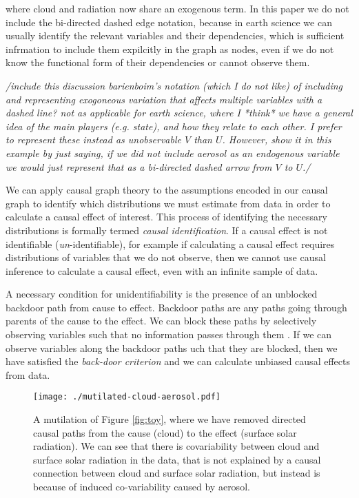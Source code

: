 \documentclass[12pt]{article}
\begin{document}
where cloud and radiation now share an exogenous term. In this paper
we do not include the bi-directed dashed edge notation, because in
earth science we can usually identify the relevant variables and their
dependencies, which is sufficient infrmation to include them
expilcitly in the graph as nodes, even if we do not know the
functional form of their dependencies or cannot observe them.

\textit{/include this discussion barienboim's notation (which I do not
  like) of including and representing exogoneous variation that
  affects multiple variables with a dashed line? not as applicable for
  earth science, where I *think* we have a general idea of the main
  players (e.g. state), and how they relate to each other. I prefer to
  represent these instead as unobservable $V$ than $U$. However, show
  it in this example by just saying, if we did not include aerosol as
  an endogenous variable we would just represent that as a bi-directed
  dashed arrow from $V$ to $U$./}

We can apply causal graph theory
\citep[e.g.,][]{pearl1995causal,shpitser2006} to the assumptions
encoded in our causal graph to identify which distributions we must
estimate from data in order to calculate a causal effect of
interest. This process of identifying the necessary distributions is
formally termed \emph{causal identification}. If a causal effect is
not identifiable (\emph{un}-identifiable), for example if calculating
a causal effect requires distributions of variables that we do not
observe, then we cannot use causal inference to calculate a causal
effect, even with an infinite sample of data.


A necessary condition for unidentifiability is the presence of an
unblocked backdoor path from cause to effect. Backdoor paths are any
paths going through parents of the cause to the effect. We can block
these paths by selectively observing variables such that no
information passes through them \citep{geiger-d-sep}. If we can
observe variables along the backdoor paths uch that they are blocked,
then we have satisfied the \emph{back-door criterion}
\citep{pearl2009} and we can calculate unbiased causal effects from
data.

\begin{figure}
  \noindent\texttt{[image: ./mutilated-cloud-aerosol.pdf]}\\
  \caption{A mutilation of Figure \ref{fig:toy}, where we have removed
    directed causal paths from the cause (cloud) to the effect (surface
    solar radiation). We can see that there is covariability between
    cloud and surface solar radiation in the data, that is not
    explained by a causal connection between cloud and surface solar
    radiation, but instead is because of induced co-variability caused
    by aerosol.}
  \label{fig:mutilated-toy}
\end{figure}
\end{document}
